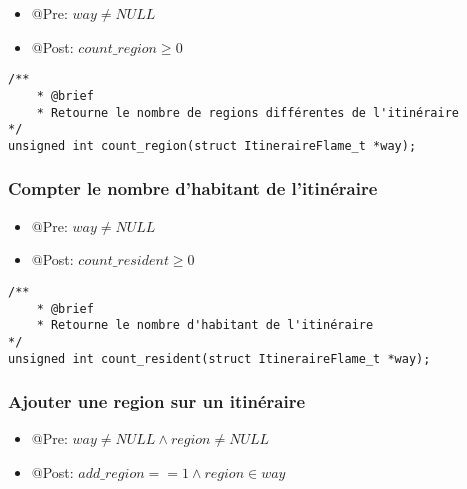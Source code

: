 \begin{itemize}
    \item @Pre: $way \ne NULL$
    \item @Post: $count\_region \ge 0$ 
\end{itemize}

\begin{lstlisting}
/**
    * @brief 
    * Retourne le nombre de regions différentes de l'itinéraire
*/
unsigned int count_region(struct ItineraireFlame_t *way); 
\end{lstlisting}


\subsubsection{Compter le nombre d'habitant de l'itinéraire}

\begin{itemize}
    \item @Pre: $way \ne NULL$
    \item @Post: $count\_resident \ge 0$ 
\end{itemize}

\begin{lstlisting}
/**
    * @brief 
    * Retourne le nombre d'habitant de l'itinéraire
*/
unsigned int count_resident(struct ItineraireFlame_t *way);  
\end{lstlisting}


\subsubsection{Ajouter une region sur un itinéraire}

\begin{itemize}
    \item @Pre: $way \ne NULL \land region \ne NULL$
    \item @Post: $add\_region == 1 \land region \in way$ 
\end{itemize}

